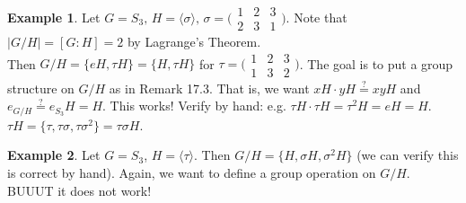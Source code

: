 \documentclass{article}
\theoremstyle{definition}
\newtheorem*{ex}{Example}
\theoremstyle{remark}
\newcommand{\gen}[1]{\langle#1\rangle}
\begin{document}
{{            \begin{ex}
                Let $G=S_3, \, H=\gen{\sigma}, \, \sigma= \big(\begin{smallmatrix} 1&2&3\\ 2&3&1 \end{smallmatrix}\big)$. Note that $|G/H|=[G:H]=2$ by Lagrange's Theorem.\\
                Then $G/H=\{eH,\tau H\}=\{H,\tau H\}$ for $\tau=\big(\begin{smallmatrix} 1&2&3\\ 1&3&2 \end{smallmatrix}\big)$. The goal is to put a group structure on $G/H$ as in Remark 17.3. That is, we want $xH\cdot yH \overset{?}{=} xyH$ and $e_{G/H}\overset{?}{=} e_{S_3}H=H$. This works! Verify by hand: e.g. $\tau H\cdot \tau H=\tau^2 H=eH=H$. $\tau H=\{\tau, \tau\sigma, \tau\sigma^2\}=\tau\sigma H$.
            \end{ex}
            
            \begin{ex}
                Let $G=S_3$, $H=\gen{\tau}$. Then $G/H=\{H, \sigma H, \sigma^2 H\}$ (we can verify this is correct by hand). Again, we want to define a group operation on $G/H$. BUUUT it does not work!
            \end{ex}
        
        }
    }
\end{document}
